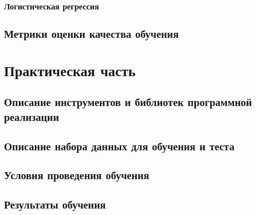 \documentclass[bachelor, och, coursework]{SCWorks}
\begin{document}
        \subsubsection{Логистическая регрессия}

            

    \subsection{Метрики оценки качества обучения}


\section{Практическая часть}

    \subsection{Описание инструментов и библиотек программной реализации}
    \subsection{Описание набора данных для обучения и теста}
    \subsection{Условия проведения обучения}
    \subsection{Результаты обучения}

\conclusion
\end{document}
